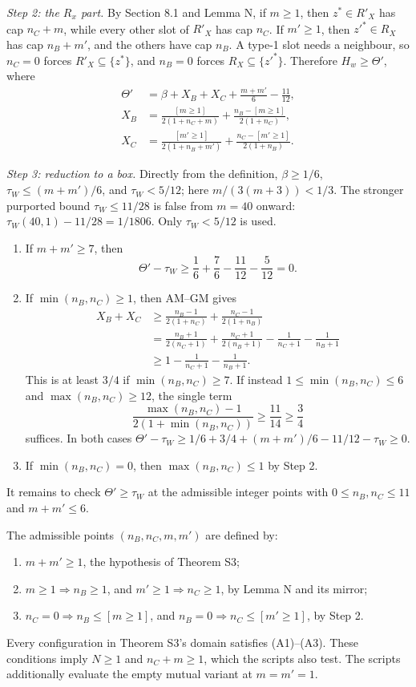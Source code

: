 \emph{Step 2: the $R_x$ part.}
By Section 8.1 and Lemma N, if $m\ge1$, then $z^*\in R'_X$ has cap $n_C+m$, while every other slot of $R'_X$ has cap $n_C$. If $m'\ge1$, then $z'^*\in R_X$ has cap $n_B+m'$, and the others have cap $n_B$. A type-1 slot needs a neighbour, so $n_C=0$ forces $R'_X\subseteq\{z^*\}$, and $n_B=0$ forces $R_X\subseteq\{z'^*\}$. Therefore $H_w\ge\Theta'$, where
\begin{align*}
 \Theta'&=\beta+X_B+X_C+\frac{m+m'}6-\frac{11}{12},\\
 X_B&=\frac{[m\ge1]}{2(1+n_C+m)}
          +\frac{n_B-[m\ge1]}{2(1+n_C)},\\
 X_C&=\frac{[m'\ge1]}{2(1+n_B+m')}
          +\frac{n_C-[m'\ge1]}{2(1+n_B)}.
\end{align*}

\emph{Step 3: reduction to a box.}
Directly from the definition, $\beta\ge1/6$, $\tau_W\le(m+m')/6$, and $\tau_W<5/12$; here $m/(3(m+3))<1/3$.
The stronger purported bound $\tau_W\le11/28$ is false from $m=40$ onward:
$\tau_W(40,1)-11/28=1/1806$. Only $\tau_W<5/12$ is used.
\begin{enumerate}
\item[(i)] If $m+m'\ge7$, then
\[
 \Theta'-\tau_W\ge\frac16+\frac76-\frac{11}{12}-\frac5{12}=0.
\]
\item[(ii)] If $\min(n_B,n_C)\ge1$, then AM--GM gives
\begin{align*}
 X_B+X_C
 &\ge\frac{n_B-1}{2(1+n_C)}+\frac{n_C-1}{2(1+n_B)}\\
 &=\frac{n_B+1}{2(n_C+1)}+\frac{n_C+1}{2(n_B+1)}
      -\frac1{n_C+1}-\frac1{n_B+1}\\
 &\ge1-\frac1{n_C+1}-\frac1{n_B+1}.
\end{align*}
This is at least $3/4$ if $\min(n_B,n_C)\ge7$. If instead
$1\le\min(n_B,n_C)\le6$ and $\max(n_B,n_C)\ge12$, the single term
\[
 \frac{\max(n_B,n_C)-1}{2(1+\min(n_B,n_C))}\ge\frac{11}{14}\ge\frac34
\]
suffices. In both cases
$\Theta'-\tau_W\ge1/6+3/4+(m+m')/6-11/12-\tau_W\ge0$.
\item[(iii)] If $\min(n_B,n_C)=0$, then $\max(n_B,n_C)\le1$ by Step 2.
\end{enumerate}
It remains to check $\Theta'\ge\tau_W$ at the admissible integer points with
$0\le n_B,n_C\le11$ and $m+m'\le6$.

The admissible points $(n_B,n_C,m,m')$ are defined by:
\begin{enumerate}
\item[(A1)] $m+m'\ge1$, the hypothesis of Theorem S3;
\item[(A2)] $m\ge1\Rightarrow n_B\ge1$, and $m'\ge1\Rightarrow n_C\ge1$, by Lemma N and its mirror;
\item[(A3)] $n_C=0\Rightarrow n_B\le[m\ge1]$, and $n_B=0\Rightarrow n_C\le[m'\ge1]$, by Step 2.
\end{enumerate}
Every configuration in Theorem S3's domain satisfies (A1)--(A3). These conditions imply $N\ge1$ and $n_C+m\ge1$, which the scripts also test. The scripts additionally evaluate the empty mutual variant at $m=m'=1$.

